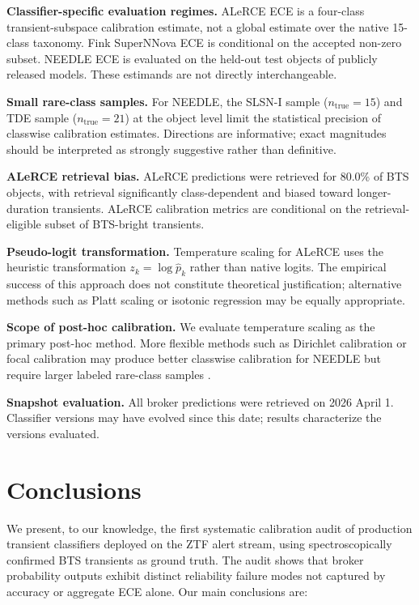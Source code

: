 \documentclass[a4paper,fleqn,usenatbib]{mnras}
\begin{document}
\textbf{Classifier-specific evaluation regimes.} ALeRCE ECE is a
four-class transient-subspace calibration estimate, not a global
estimate over the native 15-class taxonomy. Fink SuperNNova ECE
is conditional on the accepted non-zero subset. NEEDLE ECE is
evaluated on the held-out test objects of publicly released models.
These estimands are not directly interchangeable.

\textbf{Small rare-class samples.} For NEEDLE, the SLSN-I sample
($n_\mathrm{true} = 15$) and TDE sample ($n_\mathrm{true} = 21$)
at the object level limit the statistical precision of classwise
calibration estimates. Directions are informative; exact magnitudes
should be interpreted as strongly suggestive rather than definitive.

\textbf{ALeRCE retrieval bias.} ALeRCE predictions were retrieved
for 80.0\% of BTS objects, with retrieval significantly
class-dependent and biased toward longer-duration transients.
ALeRCE calibration metrics are conditional on the
retrieval-eligible subset of BTS-bright transients.

\textbf{Pseudo-logit transformation.} Temperature scaling for
ALeRCE uses the heuristic transformation $z_k = \log \hat{p}_k$
rather than native logits. The empirical success of this approach
does not constitute theoretical justification; alternative methods
such as Platt scaling or isotonic regression may be equally
appropriate.

\textbf{Scope of post-hoc calibration.} We evaluate temperature
scaling as the primary post-hoc method. More flexible methods such
as Dirichlet calibration \citep{kull2019} or focal calibration
\citep{mukhoti2020} may produce better classwise calibration for
NEEDLE but require larger labeled rare-class samples
\citep{vaicenavicius2019}.

\textbf{Snapshot evaluation.} All broker predictions were
retrieved on 2026 April 1. Classifier versions may have evolved
since this date; results characterize the versions evaluated.


\section{Conclusions} \label{sec:conclusions}

We present, to our knowledge, the first systematic calibration
audit of production transient classifiers deployed on the ZTF
alert stream, using spectroscopically confirmed BTS transients
as ground truth. The audit shows that broker probability outputs
exhibit distinct reliability failure modes not captured by
accuracy or aggregate ECE alone. Our main conclusions are:
\end{document}
